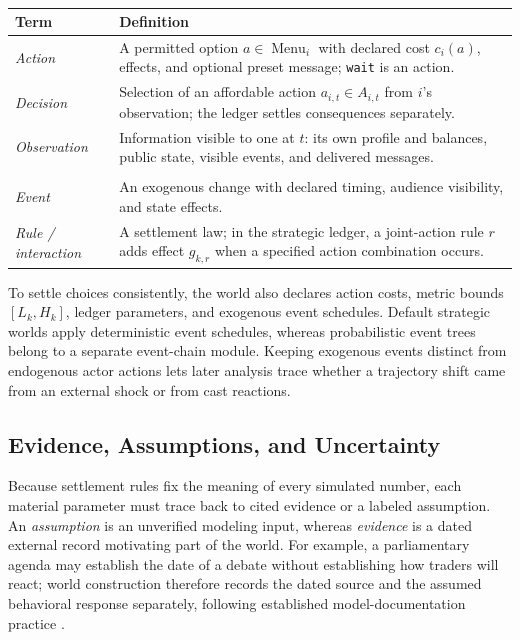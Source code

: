 \begin{table}[H]
\caption{}
\label{tab:decision-definitions}
\centering\small
\renewcommand{\arraystretch}{1.12}
\begin{tabularx}{\columnwidth}{@{}>{\raggedright\arraybackslash}p{}Y@{}}
\toprule
Term & Definition \\
\midrule
\textit{Action} & A permitted option $a \in \operatorname{Menu}_i$ with declared cost $c_i(a)$, effects, and optional preset message; \texttt{wait} is an action. \\
\textit{Decision} & Selection of an affordable action $a_{i,t} \in A_{i,t}$ from  $i$'s observation; the ledger settles consequences separately. \\
\textit{Observation} & Information visible to one  at $t$: its own profile and balances, public state, visible events, and delivered  messages. \\
 &  \\
\textit{Event} & An exogenous change with declared timing, audience visibility, and state effects. \\
\textit{Rule / interaction} & A settlement law; in the strategic ledger, a joint-action rule $r$ adds effect $g_{k,r}$ when a specified action combination occurs. \\
\bottomrule
\end{tabularx}
\end{table}

To settle choices consistently, the world also declares action costs,
metric bounds $[L_k,H_k]$, ledger parameters, and exogenous event schedules.
Default strategic worlds apply deterministic event schedules, whereas
probabilistic event trees belong to a separate event-chain module. Keeping
exogenous events distinct from endogenous actor actions lets later analysis
trace whether a trajectory shift came from an external shock or from cast
reactions.

\subsection{Evidence, Assumptions, and Uncertainty}
Because settlement rules fix the meaning of every simulated number, each
material parameter must trace back to cited evidence or a labeled assumption.
An \textit{assumption} is an unverified modeling input, whereas
\textit{evidence} is a dated external record motivating part of the world. For
example, a parliamentary agenda may establish the date of a debate without
establishing how traders will react; world construction therefore records the
dated source and the assumed behavioral response separately, following
established model-documentation practice \cite{grimm2020}.

